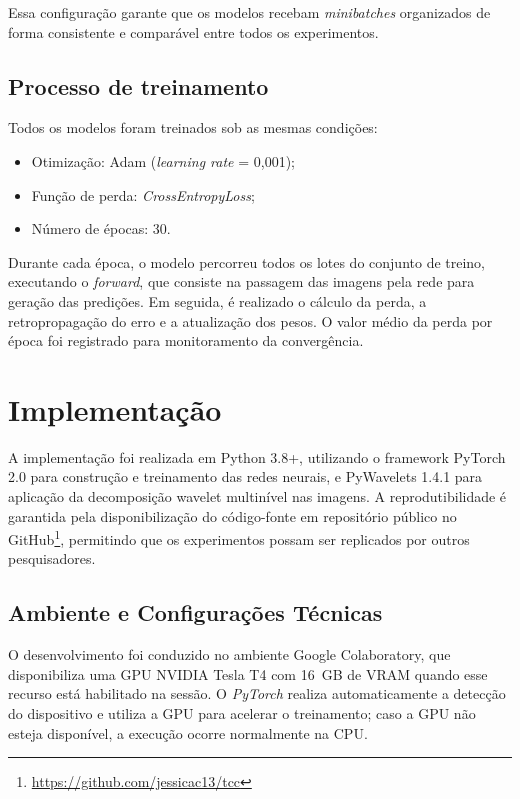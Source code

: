 Essa configuração garante que os modelos recebam \textit{minibatches} organizados de forma consistente e comparável entre todos os experimentos.

\subsection*{Processo de treinamento}

Todos os modelos foram treinados sob as mesmas condições:

\begin{itemize}
    \item Otimização: Adam (\textit{learning rate} = 0,001);
    \item Função de perda: \textit{CrossEntropyLoss};
    \item Número de épocas: 30.
    
\end{itemize}

Durante cada época, o modelo percorreu todos os lotes do conjunto de treino, 
executando o \textit{forward}, que consiste na passagem das imagens pela rede para 
geração das predições. Em seguida, é realizado o cálculo da perda, a 
retropropagação do erro e a atualização dos pesos. O valor médio da perda por 
época foi registrado para monitoramento da convergência.

\section{Implementação}

A implementação foi realizada em Python 3.8+, utilizando o framework PyTorch 2.0 para construção e treinamento das redes neurais, e PyWavelets 1.4.1 para aplicação da decomposição wavelet multinível nas imagens. A reprodutibilidade é garantida pela disponibilização do código-fonte em repositório público no GitHub\footnote{\url{https://github.com/jessicac13/tcc}}, permitindo que os experimentos possam ser replicados por outros pesquisadores.

\subsection*{Ambiente e Configurações Técnicas}

O desenvolvimento foi conduzido no ambiente Google Colaboratory, que 
disponibiliza uma GPU NVIDIA Tesla T4 com 16~GB de VRAM quando esse recurso 
está habilitado na sessão. O \textit{PyTorch} realiza automaticamente a 
detecção do dispositivo e utiliza a GPU para acelerar o treinamento; caso a GPU 
não esteja disponível, a execução ocorre normalmente na CPU.



